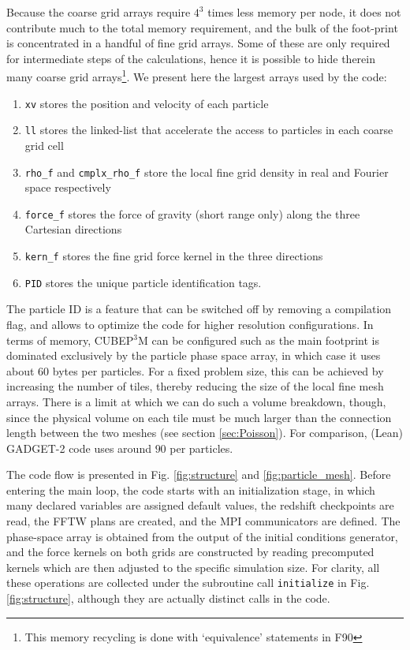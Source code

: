 \documentclass[useAMS,usenatbib]{mn2e}
\begin{document}
Because the coarse grid arrays require $4^3$ times less memory per node, 
it does not contribute much to the total memory requirement, and the bulk of the foot-print is 
concentrated in a handful of fine grid arrays.
Some of these are only required for intermediate steps of the calculations, 
hence it is possible to hide therein many coarse grid arrays\footnote{ This memory recycling is done with `equivalence' statements in {\small F90}}.   
We present here the largest arrays used by the code:
\begin{enumerate}
\item{{\tt xv} stores the position and velocity of each particle} 
\item{{\tt ll} stores the linked-list that accelerate the access to particles in each coarse grid cell}
\item{{\tt rho\_f} and {\tt cmplx\_rho\_f} store 
the local fine grid density  in real and Fourier space respectively}
\item{{\tt force\_f} stores the force of gravity (short range only) along the three Cartesian directions}
\item{{\tt kern\_f} stores the fine grid force kernel in the three directions}
\item{{\tt PID} stores the unique particle identification tags.}
\end{enumerate}
The particle ID is a feature that can be switched off by removing a compilation flag, 
and allows to optimize the code for higher resolution configurations.
In terms of memory, {\small CUBEP$^3$M} can be configured such as the main footprint is dominated exclusively by the 
particle phase space array, in which case it uses about $60$ bytes per particles. 
For a fixed problem size, this can be achieved by increasing the number of tiles, thereby reducing the size of the local fine mesh arrays.
There is a limit at which we can do such a volume breakdown, though, since the physical 
volume on each tile must be much larger than the connection length between the two meshes (see section \ref{sec:Poisson}).
%
For comparison, (Lean) {\small GADGET-2} code uses around $90$ per particles.

The code flow is presented in Fig. \ref{fig:structure} and \ref{fig:particle_mesh}.
Before entering the main loop, the code starts with an initialization stage, 
in which many declared variables are assigned default values,
the redshift checkpoints are read, the {\small FFTW} plans are created, and the {\small MPI} communicators are defined.
The phase-space array  is obtained from the output of the initial conditions generator,
and the force kernels on both grids are constructed by reading precomputed kernels which are then adjusted to the specific simulation size.
For clarity, all these operations are collected under the subroutine call {\tt initialize} in Fig. \ref{fig:structure}, 
although they are actually distinct calls in the code.
\end{document}
